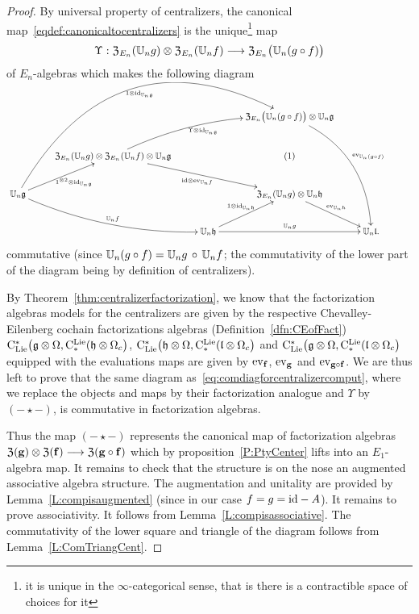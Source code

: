 \documentclass[11pt]{amsart}
\numberwithin{equation}{section}
\begin{document}
\begin{proof}
By universal property of centralizers, the canonical map~\eqref{eqdef:canonicaltocentralizers}  
is the unique\footnote{it is unique in the $\infty$-categorical 
sense, that is there is a contractible space of choices for it} map 
\[ \Upsilon: {\frak Z}_{E_n}(\mathbb U_n g) \otimes {\frak Z}_{E_n}(\mathbb U_n f) \longrightarrow {\frak Z}_{E_n}\big(\mathbb U_n (g\circ f)\big)\] 
of $E_n$-algebras which makes the following diagram
\begin{equation}\label{eq:comdiagforcentralizercomput}\small
 \xymatrix{
&   &&  
{\frak Z}_{E_n}\big(\UU_n (g\circ f) \big) \otimes  \UU_n \fg  \ar@/^{2pc}/[dddr]^{\ev_{\UU_n (g\circ f)}}\\
&{\frak Z}_{E_n}(\UU_n g) \otimes  {\frak Z}_{E_n}(\UU_n f) \otimes \UU_n \fg \ar@/^{1pc}/[rru]_{ \Upsilon \otimes \id_{\UU_n \fg}} \ar[rrd]_{\id\otimes \ev_{\UU_n f}}
&& (1)
& & \\
\UU_n \fg \ar[ur]_{1^{\otimes 2}\otimes \id_{\UU_n \fg}} \ar@/_{1pc}/[rrd]^{\UU_n f} \ar@/^{6pc}/[rrruu]_{1\otimes \id_{\UU_n \fg}} &&&
{\frak Z}_{E_n}(\UU_n g) \otimes \UU_n \fh \ar[rd]^{\ev_{\UU_n h}}  &\\
&& \UU_n \fh \ar[rr]^{\UU_n g} \ar[ur]^{1\otimes \id_{\UU_n \fh}} && \UU_n \fl .}
\end{equation}
commutative (since $\mathbb U_n (g\circ f) = \mathbb U_n g\, \circ \, \mathbb U_n f $;  the commutativity of the lower part of the diagram being by definition of centralizers).

By Theorem~\ref{thm:centralizerfactorization}, we know that the factorization algebras models for the centralizers are given by the respective Chevalley-Eilenberg cochain factorizations algebras 
(Definition~\ref{dfn:CEofFact}) ${\rm C}_{\rm Lie}^*\big(\mathfrak g \otimes \Omega, {\rm C}^{\rm Lie}_*(\mathfrak h \otimes \Omega_c  \big) $, 
${\rm C}_{\rm Lie}^*\big(\mathfrak h \otimes \Omega, {\rm C}^{\rm Lie}_*(\mathfrak l \otimes \Omega_c  \big) $ and ${\rm C}_{\rm Lie}^*\big(\mathfrak g \otimes \Omega, {\rm C}^{\rm Lie}_*(\mathfrak l \otimes \Omega_c  \big) $ 
equipped with the evaluations maps are given by ${\rm ev}_{\mathbf{f}}$, ${\rm ev}_{\mathbf{g}}$ and ${\rm ev}_{\mathbf{g}\circ \mathbf{f}}$. We are thus left 
to prove that the same  diagram as~\eqref{eq:comdiagforcentralizercomput}, where we replace the objects and maps by their factorization analogue and $\Upsilon$
by $(-\star-)$, is commutative in factorization algebras.

Thus the map $(-\star-)$ represents the canonical map of factorization algebras 
$ {\frak Z}(\mathbf{g}) \otimes {\frak Z}(\mathbf{f}) \longrightarrow {\frak Z}(\mathbf{g}\circ \mathbf{f})$ which by proposition~\ref{P:PtyCenter} lifts
into an $E_1$-algebra map. It remains to check that the structure is on the nose an augmented associative algebra structure.
The augmentation and unitality are provided by Lemma~\ref{L:compisaugmented} (since in our case $f=g={\rm id}-A$). 
It remains to prove associativity. It follows from Lemma~\ref{L:compisassociative}. 
The commutativity of the lower square and triangle of the diagram follows from Lemma~\ref{L:ComTriangCent}.
\end{proof}
\end{document}
